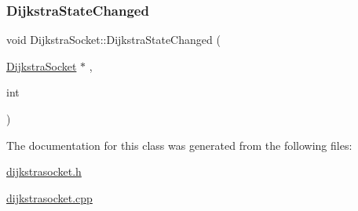 \mbox{\label{class_dijkstra_socket_a4527ae22be46f923b0c13eabf170e96f}} 
\subsubsection{\texorpdfstring{Dijkstra\+State\+Changed}{DijkstraStateChanged}}
{\footnotesize\ttfamily void Dijkstra\+Socket\+::\+Dijkstra\+State\+Changed (\begin{DoxyParamCaption}\item[{\hyperlink{class_dijkstra_socket}{Dijkstra\+Socket} $\ast$}]{,  }\item[{int}]{ }\end{DoxyParamCaption})\hspace{0.3cm}{\ttfamily [signal]}}



The documentation for this class was generated from the following files\+:\begin{DoxyCompactItemize}
\item 
\hyperlink{dijkstrasocket_8h}{dijkstrasocket.\+h}\item 
\hyperlink{dijkstrasocket_8cpp}{dijkstrasocket.\+cpp}\end{DoxyCompactItemize}
